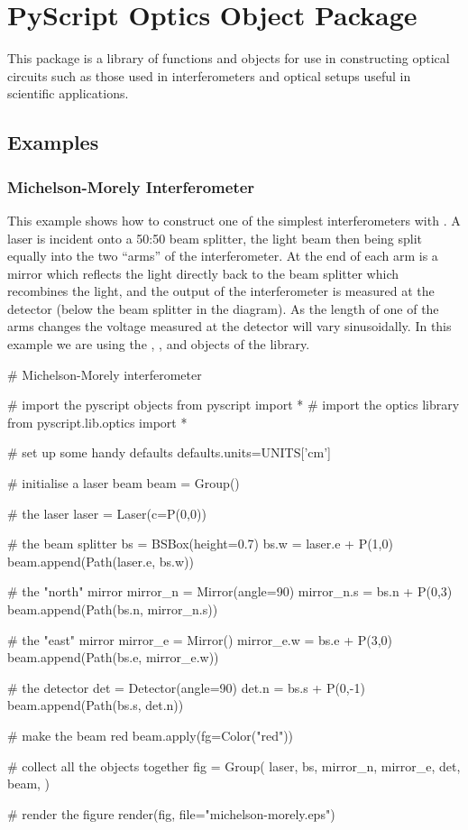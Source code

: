 \chapter{PyScript Optics Object Package}

This package is a library of functions and objects for use in constructing
optical circuits such as those used in interferometers and optical setups
useful in scientific applications.

\section{Examples}

\subsection{Michelson-Morely Interferometer}

This example shows how to construct one of the simplest interferometers with
\pyscript.  A laser is incident onto a 50:50 beam splitter, the light beam
then being split equally into the two ``arms'' of the interferometer.  At
the end of each arm is a mirror which reflects the light directly back to
the beam splitter which recombines the light, and the output of the
interferometer is measured at the detector (below the beam splitter in the
diagram).  As the length of one of the arms changes the voltage measured at
the detector will vary sinusoidally.  In this example we are using the
, ,  and  objects of the
 library.

\begin{python}
# Michelson-Morely interferometer

# import the pyscript objects
from pyscript import *
# import the optics library
from pyscript.lib.optics import *

# set up some handy defaults
defaults.units=UNITS['cm']

# initialise a laser beam
beam = Group()

# the laser
laser = Laser(c=P(0,0))

# the beam splitter
bs = BSBox(height=0.7)
bs.w = laser.e + P(1,0)
beam.append(Path(laser.e, bs.w))

# the "north" mirror
mirror_n = Mirror(angle=90)
mirror_n.s = bs.n + P(0,3)
beam.append(Path(bs.n, mirror_n.s))

# the "east" mirror
mirror_e = Mirror()
mirror_e.w = bs.e + P(3,0)
beam.append(Path(bs.e, mirror_e.w))

# the detector
det = Detector(angle=90)
det.n = bs.s + P(0,-1)
beam.append(Path(bs.s, det.n))

# make the beam red
beam.apply(fg=Color("red"))

# collect all the objects together
fig = Group(
        laser,
        bs,
        mirror_n, mirror_e,
        det,
        beam,
        )

# render the figure
render(fig,
        file="michelson-morely.eps")
\end{python}

